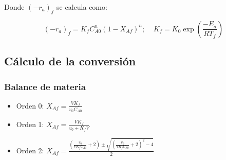 \documentclass[20pt,a4paper]{extarticle}
\begin{document}
			Donde $(-r_a)_f$ se calcula como:
			
			\begin{equation*}
				(-r_a)_f = K_fC_{A0}^n (1-X_{Af})^n; ~~~~~ K_f = K_0 \exp \left(\frac{-E_a}{RT_f}\right)
			\end{equation*}
	
	\subsection{Cálculo de la conversión}
		\subsubsection{Balance de materia}
			\begin{itemize}
				\item Orden 0: $X_{Af} = \frac{VK_f}{v_0C_{A0}}$
				\item Orden 1: $X_{Af} = \frac{VK_f}{v_0+K_fV}$
				\item Orden 2: $X_{Af} = \frac{\left(\frac{v_0}{VK_fC_{A0}}+2\right)\pm \sqrt{\left(\frac{v_0}{VK_fC_{A0}}+2\right)^2-4}}{2}$
			\end{itemize}
\end{document}
